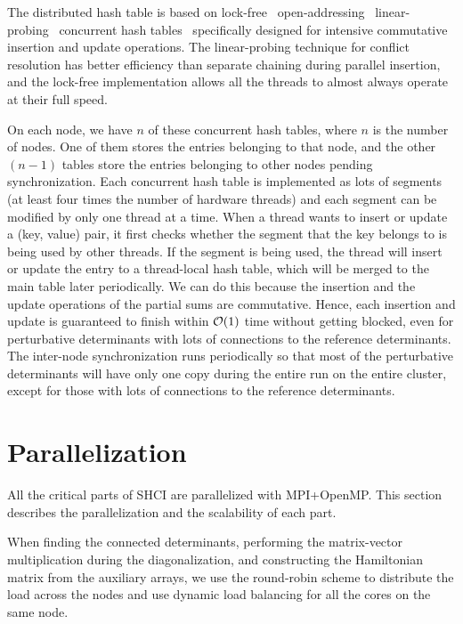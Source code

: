 \documentclass[%
reprint,
 superscriptaddress,
 amsmath,amssymb,
 aps,
]{revtex4-1}
\begin{document}
{\color{black}
The distributed hash table is based on lock-free~\cite{LockFree} open-addressing~\cite{OpenAddressing} linear-probing~\cite{LinearProbing} concurrent hash tables~\cite{chen2018concurrent} specifically designed
for intensive commutative insertion and update operations.
}
The linear-probing technique for conflict resolution has better efficiency than separate chaining during parallel insertion,
and the lock-free implementation allows all the threads to almost always operate at their full speed.

On each node, we have $n$ of these concurrent hash tables, where $n$ is the number of nodes.
One of them stores the entries belonging to that node, and the other $(n-1)$ tables store the entries belonging to other nodes pending synchronization.
Each concurrent hash table is implemented as lots of segments (at least four times the number of hardware threads) and each segment can be modified by only one thread at a time.
When a thread wants to insert or update a (key, value) pair, it first checks whether the segment that the key belongs to is being used by other threads.
If the segment is being used, the thread will insert or update the entry to a thread-local hash table, which will be merged to the main table later periodically.
We can do this because the insertion and the update operations of the partial sums are commutative.
Hence, each insertion and update is guaranteed to finish within ${\cal O}(1)$ time without getting blocked, even for perturbative determinants with lots of connections to the reference determinants.
The inter-node synchronization runs periodically so that most of the perturbative determinants will have only one copy during the entire run on the entire cluster, except for those with lots of connections to the reference determinants.

\section{Parallelization}
\label{para}

All the critical parts of SHCI are parallelized with MPI+OpenMP.
This section describes the parallelization and the scalability of each part.

When finding the connected determinants, performing the matrix-vector multiplication during the diagonalization,
and constructing the Hamiltonian matrix from the auxiliary arrays, we use the round-robin scheme to distribute the load across the nodes
and use dynamic load balancing for all the cores on the same node.
\end{document}

